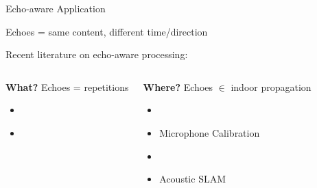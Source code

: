 \begin{frame}{Echo-aware Application}

    \begin{block}{Echoes = same content, different time/direction}
        \centering
    \end{block}

    \pause[4]
    Recent literature on echo-aware processing:
    \pause[5]
    \begin{columns}[T,onlytextwidth]
        \begin{block}{\textbf{What?}}
            \small
            Echoes = repetitions
            \begin{itemize}
                \item {}
                \\{\footnotesize\cite{leglaive2016multichannel}}
                \item {}
                \\{\footnotesize\cite{flanagan1993spatially,dokmanic2015raking,kowalczyk2020raking}}
            \end{itemize}
        \end{block}

        \pause[6]
        \begin{block}{\textbf{Where?}}
            \small
            Echoes $\in$ indoor propagation
            \begin{itemize}
                \item {}
                \\{\footnotesize\cite{ribeiro2010turning,jensen2019method}}
                \item Microphone Calibration
                \\{\footnotesize\cite{dokmanic2015raking,salvati2016sound}}
                \item {}
                \\{\footnotesize\cite{antonacci2012inferences,crocco2017uncalibrated}}
                \item Acoustic SLAM
                \\{\footnotesize\cite{evers2018acoustic,krekovic2016echoslam}}
            \end{itemize}
        \end{block}


\end{columns}
\end{frame}
